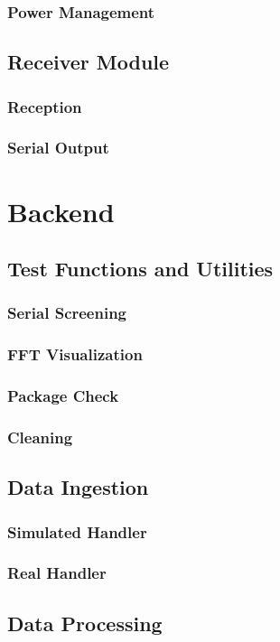 \documentclass{article}
\begin{document}
    \subsubsection{Power Management}
\subsection{Receiver Module}
    \subsubsection{Reception}
    \subsubsection{Serial Output}

\section{Backend}
\subsection{Test Functions and Utilities}
    \subsubsection{Serial Screening}
    \subsubsection{FFT Visualization}
    \subsubsection{Package Check}
    \subsubsection{Cleaning}
\subsection{Data Ingestion}
    \subsubsection{Simulated Handler}
    \subsubsection{Real Handler}
\subsection{Data Processing}
\end{document}
